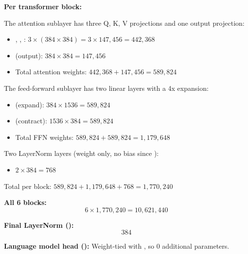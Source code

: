 \textbf{Per transformer block:}

The attention sublayer has three Q, K, V projections and one output projection:
\begin{itemize}
  \item {}, , : $3 \times (384 \times 384) = 3 \times 147{,}456 = 442{,}368$
  \item {} (output): $384 \times 384 = 147{,}456$
  \item Total attention weights: $442{,}368 + 147{,}456 = 589{,}824$
\end{itemize}


The feed-forward sublayer has two linear layers with a 4x expansion:
\begin{itemize}
  \item {} (expand): $384 \times 1536 = 589{,}824$
  \item {} (contract): $1536 \times 384 = 589{,}824$
  \item Total FFN weights: $589{,}824 + 589{,}824 = 1{,}179{,}648$
\end{itemize}

Two LayerNorm layers (weight only, no bias since ):
\begin{itemize}
  \item $2 \times 384 = 768$
\end{itemize}

Total per block: $589{,}824 + 1{,}179{,}648 + 768 = 1{,}770{,}240$

\textbf{All 6 blocks:}
\[6 \times 1{,}770{,}240 = 10{,}621{,}440\]

\textbf{Final LayerNorm ():}
\[384\]

\textbf{Language model head ():}
Weight-tied with , so 0 additional parameters.

